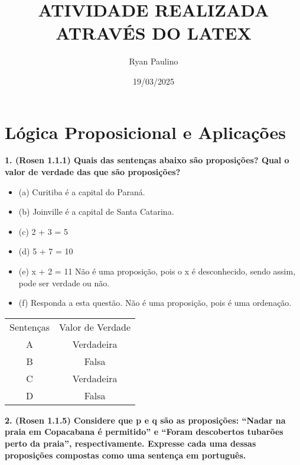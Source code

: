 \documentclass{article}
\title{ATIVIDADE REALIZADA ATRAVÉS DO LATEX}
\author{Ryan Paulino}
\date{19/03/2025}
\begin{document}
\maketitle


\section{Lógica Proposicional e Aplicações}

\textbf{1. (Rosen 1.1.1) Quais das sentenças abaixo são proposições? Qual o valor de verdade das que são proposições?}
\begin{itemize}[label={}]
    \item (a) Curitiba é a capital do Paraná.
    \item (b) Joinville é a capital de Santa Catarina.
    \item (c) 2 + 3 = 5
    \item (d) 5 + 7 = 10
    \item (e) x + 2 = 11 \> Não é uma proposição, pois o x é desconhecido, sendo assim, pode ser verdade ou não.
    \item (f) Responda a esta questão. \> Não é uma proposição, pois é uma ordenação.
\end{itemize}

\begin{table}[h]
    \centering
    \begin{tabular}{c|c}
    \hline
    Sentenças & Valor de Verdade \\
       A   & Verdadeira \\
       B   & Falsa \\
       C   & Verdadeira \\
       D  & Falsa \\
    \hline
       
    \end{tabular}
\end{table}

    \vspace{1cm}
    \textbf{2. (Rosen 1.1.5) Considere que p e q são as proposições: “Nadar na praia em Copacabana é permitido” e “Foram descobertos tubarões perto da praia”, respectivamente. Expresse cada uma dessas proposições compostas como uma sentença em português.}
\end{document}
